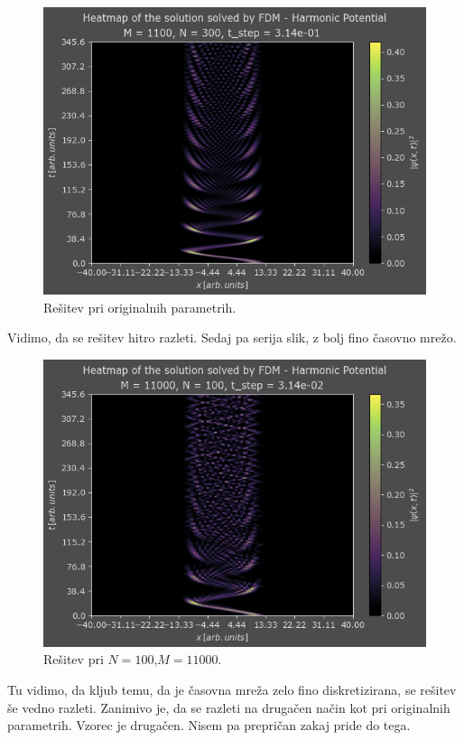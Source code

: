 \documentclass[a4paper]{article}
\begin{document}
\begin{figure}[H]
    \centering
    \includegraphics[width=\textwidth]{./images/case1_org.png}
    \caption{Rešitev pri originalnih parametrih.}
    \label{fig:harmonic_oscillator_org}
\end{figure}

Vidimo, da se rešitev hitro razleti. Sedaj pa serija slik, z bolj fino časovno mrežo.

\begin{figure}[H]
    \centering
    \includegraphics[width=\textwidth]{./images/case1_N100.png}
    \caption{Rešitev pri $N=100$,$M=11000$.}
\end{figure}

Tu vidimo, da kljub temu, da je časovna mreža zelo fino diskretizirana, se rešitev še vedno razleti.
Zanimivo je, da se razleti na drugačen način kot pri originalnih parametrih. Vzorec je drugačen. Nisem 
pa prepričan zakaj pride do tega. 
\end{document}
